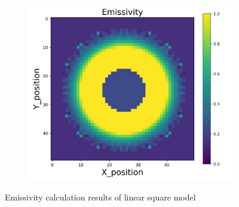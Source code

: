 {\begin{figure}[p]
\begin{minipage}{\textwidth}
\begin{subfigure}{0.325\textwidth}
        \end{subfigure}
        \begin{subfigure}{0.325\textwidth}
            \centering
            \includegraphics[width=\textwidth]{figures/raw_data/33/lin_square/emi_cal.jpg}
        \end{subfigure}
    \end{minipage}
    \caption{Emissivity calculation results of linear square model}  
\end{figure}


\newpage
}
